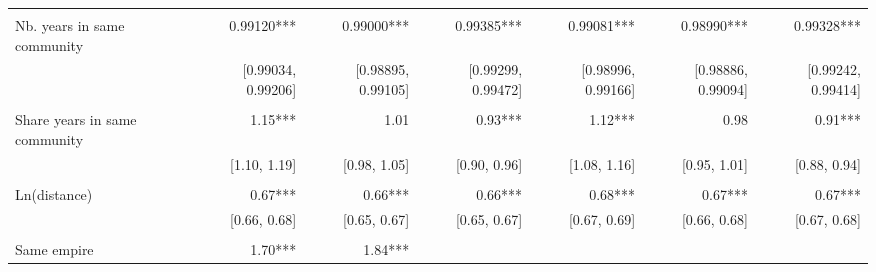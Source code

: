 \begin{table}[!h]
\begin{tabular}{lllllll}
  \multicolumn{1}{r}{} &
  \multicolumn{1}{r}{} \\
\multicolumn{1}{l}{Nb. years in same community} &
  \multicolumn{1}{|r}{0.99120***} &
  \multicolumn{1}{r}{0.99000***} &
  \multicolumn{1}{r}{0.99385***} &
  \multicolumn{1}{r}{0.99081***} &
  \multicolumn{1}{r}{0.98990***} &
  \multicolumn{1}{r}{0.99328***} \\
\multicolumn{1}{l}{} &
  \multicolumn{1}{|r}{[0.99034, 0.99206]} &
  \multicolumn{1}{r}{[0.98895, 0.99105]} &
  \multicolumn{1}{r}{[0.99299, 0.99472]} &
  \multicolumn{1}{r}{[0.98996, 0.99166]} &
  \multicolumn{1}{r}{[0.98886, 0.99094]} &
  \multicolumn{1}{r}{[0.99242, 0.99414]} \\
\multicolumn{1}{l}{} &
  \multicolumn{1}{|r}{} &
  \multicolumn{1}{r}{} &
  \multicolumn{1}{r}{} &
  \multicolumn{1}{r}{} &
  \multicolumn{1}{r}{} &
  \multicolumn{1}{r}{} \\
\multicolumn{1}{l}{Share years in same community} &
  \multicolumn{1}{|r}{1.15***} &
  \multicolumn{1}{r}{1.01} &
  \multicolumn{1}{r}{0.93***} &
  \multicolumn{1}{r}{1.12***} &
  \multicolumn{1}{r}{0.98} &
  \multicolumn{1}{r}{0.91***} \\
\multicolumn{1}{l}{} &
  \multicolumn{1}{|r}{[1.10,    1.19]} &
  \multicolumn{1}{r}{[0.98,    1.05]} &
  \multicolumn{1}{r}{[0.90,    0.96]} &
  \multicolumn{1}{r}{[1.08,    1.16]} &
  \multicolumn{1}{r}{[0.95,    1.01]} &
  \multicolumn{1}{r}{[0.88,    0.94]} \\
\multicolumn{1}{l}{} &
  \multicolumn{1}{|r}{} &
  \multicolumn{1}{r}{} &
  \multicolumn{1}{r}{} &
  \multicolumn{1}{r}{} &
  \multicolumn{1}{r}{} &
  \multicolumn{1}{r}{} \\
\multicolumn{1}{l}{Ln(distance)} &
  \multicolumn{1}{|r}{0.67***} &
  \multicolumn{1}{r}{0.66***} &
  \multicolumn{1}{r}{0.66***} &
  \multicolumn{1}{r}{0.68***} &
  \multicolumn{1}{r}{0.67***} &
  \multicolumn{1}{r}{0.67***} \\
\multicolumn{1}{l}{} &
  \multicolumn{1}{|r}{[0.66,    0.68]} &
  \multicolumn{1}{r}{[0.65,    0.67]} &
  \multicolumn{1}{r}{[0.65,    0.67]} &
  \multicolumn{1}{r}{[0.67,    0.69]} &
  \multicolumn{1}{r}{[0.66,    0.68]} &
  \multicolumn{1}{r}{[0.67,    0.68]} \\
\multicolumn{1}{l}{} &
  \multicolumn{1}{|r}{} &
  \multicolumn{1}{r}{} &
  \multicolumn{1}{r}{} &
  \multicolumn{1}{r}{} &
  \multicolumn{1}{r}{} &
  \multicolumn{1}{r}{} \\
\multicolumn{1}{l}{Same empire} &
  \multicolumn{1}{|r}{1.70***} &
  \multicolumn{1}{r}{1.84***} &

\end{tabular}
\end{table}
